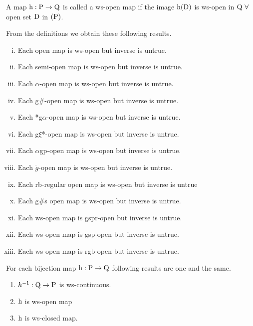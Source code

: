 \begin{dfn}\label{defi4.2.37}
A map $\mathrm{h}: \mathrm{P} \to \mathrm{Q}$ is called a ws-open map if the image $\mathrm{h} (\mathrm{D})$ is ws-open in $\mathrm{Q} \ \forall$ open set $\mathrm{D}$ in $(\mathrm{P})$. 

From the definitions we obtain these following results.
\end{dfn}

\begin{thm}\label{thm4.2.38}
\begin{enumerate}[(i)]
\item Each open map is ws-open but inverse is untrue.
\item Each semi-open map is ws-open but inverse is untrue.
\item Each $\alpha$-open map is ws-open but inverse is untrue.
\item Each g\#-open map is ws-open but inverse is untrue.
\item Each *g$\alpha$-open map is ws-open but inverse is untrue.
\item Each g$\xi$*-open map is ws-open but inverse is untrue.
\item Each $\alpha$gp-open map is ws-open but inverse is untrue.
\item Each $\ddot{g}$-open map is ws-open but inverse is untrue.
\item Each rb-regular open map is ws-open but inverse is untrue
\item Each g\#s open map is ws-open but inverse is untrue.
\item Each ws-open map is gspr-open but inverse is untrue.
\item Each ws-open map is gsp-open but inverse is untrue.
\item Each ws-open map is rgb-open but inverse is untrue.
\end{enumerate}
\end{thm}

\begin{thm}\label{thm4.2.39}
For each bijection map $\mathrm{h}: \mathrm{P} \to \mathrm{Q}$ following results are one and the same.
\begin{enumerate}[(1)]
\item $h^{-1} : \mathrm{Q} \to \mathrm{P}$ is ws-continuous.
\item $\mathrm{h}$ is ws-open map
\item $\mathrm{h}$ is ws-closed map.
\end{enumerate}
\end{thm}

